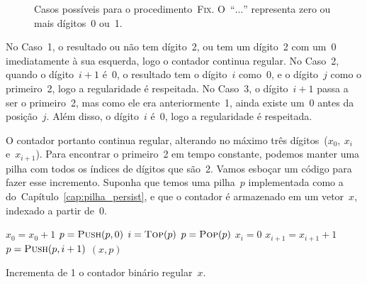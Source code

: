 \documentclass[main.tex]{subfiles}
\begin{document}
\begin{figure}[h]

\caption{Casos possíveis para o procedimento~\textsc{Fix}. O~``$\ldots$'' representa zero ou mais dígitos~0 ou~1.} \label{fig:cont_ex}
\end{figure}

No Caso~1, o resultado ou não tem dígito~2, ou tem um dígito~2 com um~0 imediatamente à sua esquerda, logo o contador continua regular. No Caso~2, quando o dígito~$i + 1$ é~0, o resultado tem o dígito~$i$ como~0, e o dígito~$j$ como o primeiro~2, logo a regularidade é respeitada. No Caso~3, o dígito~$i+1$ passa a ser o primeiro~2, mas como ele era anteriormente~1, ainda existe um~0 antes da posição~$j$. Além disso, o dígito~$i$ é~0, logo a regularidade é respeitada.

O contador portanto continua regular, alterando no máximo três dígitos~($x_0,\ x_i$ e~$x_{i+1}$). Para encontrar o primeiro~2 em tempo constante, podemos manter uma pilha com todos os índices de dígitos que são~2. Vamos esboçar um código para fazer esse incremento. Suponha que temos uma pilha~$p$ implementada como a do~Capítulo~\ref{cap:pilha_persist}, e que o contador é armazenado em um vetor~$x$, indexado a partir de~0.


\begin{algorithm}
\begin{algorithmic}[1]

    \State $x_0 = x_0 + 1$
        \State $p = \Call{Push}{p, 0}$
    \EndIf
     
        \State $i = \Call{Top}{p}$
        \State $p = \Call{Pop}{p}$
        \State $x_i = 0$
        \State $x_{i+1} = x_{i+1} + 1$
            \State $p = \Call{Push}{p, i + 1}$
        \EndIf
    \EndIf
    \State \Return $(x, p)$
\EndFunction

\end{algorithmic}
\caption{Incrementa de 1 o contador binário regular~$x$. \label{lst:cnt_reg}}
\end{algorithm}
\end{document}

